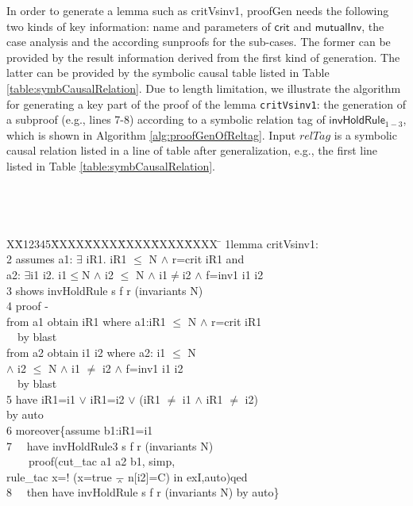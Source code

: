 \documentclass[conference]{IEEEtran}
\newlength{\fminilength}
\newenvironment{fmini}[1][\linewidth]
  {\setlength{\fminilength}{#1\fboxsep-2\fboxrule}%
   \vspace{2ex}\noindent\begin{lrbox}{\fminibox}\begin{minipage}{\fminilength}%
   \mbox{ }\hfill\vspace{-2.5ex}}%
  {\end{minipage}\end{lrbox}\vspace{1ex}\hspace{0ex}%
   \framebox{\usebox{\fminibox}}}
\newenvironment{specification}
{\noindent\scriptsize
\tt\begin{fmini}\begin{tabbing}X\=X12345\=XXXX\=XXXX\=XXXX\=XXXX\=XXXX
\=\+\kill} {\end{tabbing}\normalfont\end{fmini}}
\def \twoSpaces {\ \ }
\def \andc {\barwedge }
\def \negc {!}
\def \iInv {i}
\def \iR {iR}
\begin{document}
{In order to generate a lemma such as {\sf critVsinv1}, {\sf proofGen} needs the following two kinds of key information: name and parameters of $\mathsf{crit}$ and $\mathsf{mutualInv}$, the case analysis and the according sunproofs for the sub-cases.  The former can be provided by the result information derived from the first kind of generation. The latter can be provided by the symbolic causal table listed in Table \ref{table:symbCausalRelation}.
Due to length limitation, we illustrate the algorithm  for generating  a key part of the proof of the lemma {\tt critVsinv1}: the generation of a subproof (e.g., lines 7-8) according to a symbolic  relation tag of $\mathsf{invHoldRule}_{1-3}$, which is shown in Algorithm \ref{alg:proofGenOfReltag}. Input $relTag$ is a symbolic causal relation listed in a line of table after generalization, e.g., the first line listed in Table \ref{table:symbCausalRelation}.

\begin{specification}
1lemma critVsinv1:\\
2  assumes  a1: $\exists$ \iR1. \iR1 $\le$ N $\wedge$ r=crit \iR1 and \\
  a2: $\exists$\iInv1 \iInv2. \iInv1$\le$N $\wedge$ \iInv2 $\le$ N $\wedge$ \iInv1$\neq$\iInv2    $\wedge$ f=inv1  \iInv1 \iInv2\\
3  shows  invHoldRule s f r (invariants
  N)\\
4  proof -\\
   from a1 obtain \iR1 where a1:\iR1 $\le$ N $\wedge$ r=crit \iR1 \\
\twoSpaces   by blast\\
   from a2 obtain \iInv1 \iInv2 where a2: \iInv1 $\le$ N \\
   $\wedge$ \iInv2 $\le$ N $\wedge$ \iInv1 $\neq$ \iInv2 $\wedge$ f=inv1  \iInv1 \iInv2\\
\twoSpaces   by blast \\
5  have iR1=\iInv1 $\vee$ \iR1=\iInv2 $\vee$ (\iR1 $\ne$ \iInv1 $\wedge$  \iR1 $\ne$ \iInv2) \\
  by auto\\

6  moreover\{assume  b1:\iR1=\iInv1\\
7  \twoSpaces have invHoldRule3 s f r (invariants N)\\
 \twoSpaces  \twoSpaces   proof(cut\_tac a1 a2 b1, simp, \\
 rule\_tac x=$\negc$ (x=true $\andc$ n[\iInv2]=C)  in exI,auto)qed\\
8  \twoSpaces then have invHoldRule s f r
(invariants
  N)
by auto\}\\


\end{specification}}
\end{document}
